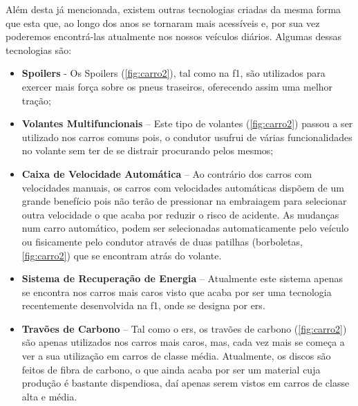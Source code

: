 \documentclass{report}
\begin{document}
Além desta já mencionada, existem outras tecnologias criadas da mesma forma que esta que, ao longo dos anos se tornaram mais acessíveis e, por sua vez poderemos encontrá-las atualmente nos nossos veículos diários.
Algumas dessas tecnologias são:
\begin{itemize}

\item \textbf{Spoilers} - Os Spoilers (\autoref{fig:carro2}), tal como na \ac{f1}, são utilizados para exercer mais força sobre os pneus traseiros, oferecendo assim uma melhor tração;

\item \textbf{Volantes Multifuncionais} – Este tipo de volantes (\autoref{fig:carro2}) passou a ser utilizado nos carros comuns pois, o condutor usufrui de várias funcionalidades no volante sem ter de se distrair procurando pelos mesmos;

\item \textbf{Caixa de Velocidade Automática} – Ao contrário dos carros com velocidades manuais, os carros com velocidades automáticas dispõem de um grande benefício pois não terão de pressionar na embraiagem para selecionar outra velocidade o que acaba por reduzir o risco de acidente. As mudanças num carro automático, podem ser selecionadas automaticamente pelo veículo ou fisicamente pelo condutor através de duas patilhas (borboletas, \autoref{fig:carro2}) que se encontram atrás do volante.

\item \textbf{Sistema de Recuperação de Energia} – Atualmente este sistema apenas se encontra nos carros mais caros visto que acaba por ser uma tecnologia recentemente desenvolvida na \ac{f1}, onde se designa por \ac{ers}. 

\item \textbf{Travões de Carbono} – Tal como o \ac{ers}, os travões de carbono (\autoref{fig:carro2}) são apenas utilizados nos carros mais caros, mas, cada vez mais se começa a ver a sua utilização em carros de classe média. Atualmente, os discos são feitos de fibra de carbono, o que ainda acaba por ser um material cuja produção é bastante dispendiosa, daí apenas serem vistos em carros de classe alta e média.\\[1cm]


\end{itemize}
\end{document}
